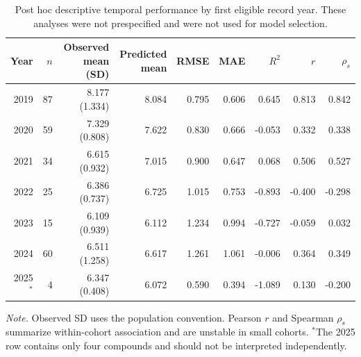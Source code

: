 \begin{table}[H]
\centering
\caption{Post hoc descriptive temporal performance by first eligible record year. These analyses were not prespecified and were not used for model selection.}
\label{tab:temporal-year}
\scriptsize
\setlength{\tabcolsep}{2.4pt}
\begin{tabular*}{0.99\textwidth}{@{\extracolsep{\fill}}rrrrrrrrr@{}}
\toprule
\textbf{Year} & \textbf{$n$} & \textbf{Observed mean (SD)} & \textbf{Predicted mean} & \textbf{RMSE} & \textbf{MAE} & \textbf{$R^2$} & \textbf{$r$} & \textbf{$\rho_s$} \\
\midrule
2019 & 87 & 8.177 (1.334) & 8.084 & 0.795 & 0.606 & 0.645 & 0.813 & 0.842 \\
2020 & 59 & 7.329 (0.808) & 7.622 & 0.830 & 0.666 & -0.053 & 0.332 & 0.338 \\
2021 & 34 & 6.615 (0.932) & 7.015 & 0.900 & 0.647 & 0.068 & 0.506 & 0.527 \\
2022 & 25 & 6.386 (0.737) & 6.725 & 1.015 & 0.753 & -0.893 & -0.400 & -0.298 \\
2023 & 15 & 6.109 (0.939) & 6.112 & 1.234 & 0.994 & -0.727 & -0.059 & 0.032 \\
2024 & 60 & 6.511 (1.258) & 6.617 & 1.261 & 1.061 & -0.006 & 0.364 & 0.349 \\
2025$^\ast$ & 4 & 6.347 (0.408) & 6.072 & 0.590 & 0.394 & -1.089 & 0.130 & -0.200 \\
\bottomrule
\end{tabular*}
\par\vspace{2pt}\parbox{0.97\textwidth}{\footnotesize \textit{Note.} Observed SD uses the population convention. Pearson $r$ and Spearman $\rho_s$ summarize within-cohort association and are unstable in small cohorts. $^\ast$The 2025 row contains only four compounds and should not be interpreted independently.}
\end{table}
